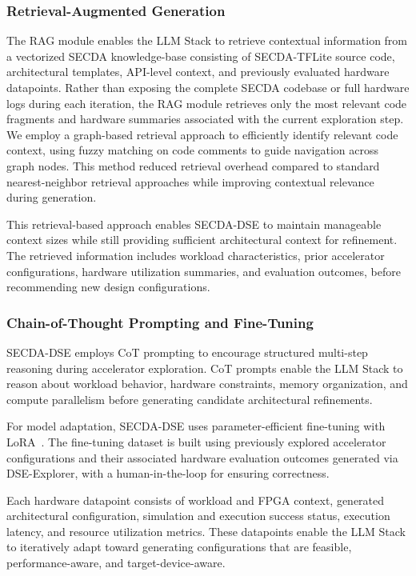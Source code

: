 \subsubsection{Retrieval-Augmented Generation}
The RAG module enables the LLM Stack to retrieve contextual information from a vectorized SECDA knowledge-base consisting of SECDA-TFLite source code, architectural templates, API-level context, and previously evaluated hardware datapoints. 
Rather than exposing the complete SECDA codebase or full hardware logs during each iteration, the RAG module retrieves only the most relevant code fragments and hardware summaries associated with the current exploration step. We employ a graph-based retrieval approach to efficiently identify relevant code context, using fuzzy matching on code comments to guide navigation across graph nodes. This method reduced retrieval overhead compared to standard nearest-neighbor retrieval approaches while improving contextual relevance during generation. 

This retrieval-based approach enables SECDA-DSE to maintain manageable context sizes while still providing sufficient architectural context for refinement. The retrieved information includes workload characteristics, prior accelerator configurations, hardware utilization summaries, and evaluation outcomes, before recommending new design configurations.


\subsubsection{Chain-of-Thought Prompting and Fine-Tuning}
SECDA-DSE employs CoT prompting to encourage structured multi-step reasoning during accelerator exploration. CoT prompts enable the LLM Stack to reason about workload behavior, hardware constraints, memory organization, and compute parallelism before generating candidate architectural refinements.

For model adaptation, SECDA-DSE uses parameter-efficient fine-tuning with LoRA~\cite{hu2022lora}. The fine-tuning dataset is built using previously explored accelerator configurations and their associated hardware evaluation outcomes generated via DSE-Explorer, with a human-in-the-loop for ensuring correctness.

Each hardware datapoint consists of workload and FPGA context, generated architectural configuration, simulation and execution success status, execution latency, and resource utilization metrics. These datapoints enable the LLM Stack to iteratively adapt toward generating configurations that are feasible, performance-aware, and target-device-aware.



